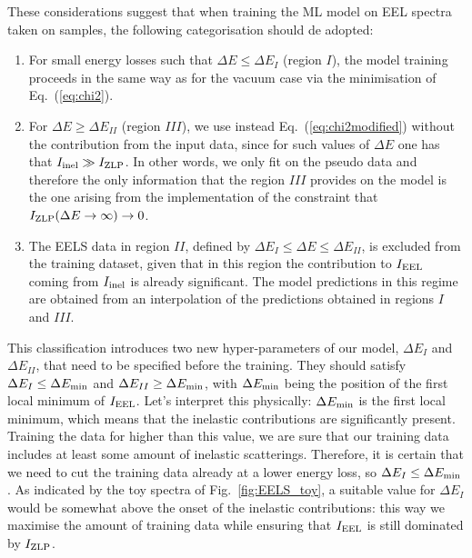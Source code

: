 These considerations suggest that when training the ML model on EEL spectra taken on samples,
the following categorisation should de adopted:

\begin{enumerate}

\item For small energy losses such that $\Delta E \le \Delta E_I$ (region $I$),
  the model training  proceeds in the same way as for the vacuum case
  via the minimisation of Eq.~(\ref{eq:chi2}).

\item  
  For $\Delta E \ge \Delta E_{II}$ (region $III$), we use instead Eq.~(\ref{eq:chi2modified})
  without the contribution from the input data, since for such values
  of $\Delta E$ one has that $I_{\rm inel}\gg I_{\rm ZLP}$.
  In other words, we only fit on the pseudo data and therefore
  the only information that the region $III$ provides
  on the model is the one arising from the implementation
  of the constraint that $I_{\rm ZLP}(\Delta E\to \infty)\to 0$.

\item The EELS data in region $II$, defined by $\Delta E_I \le \Delta E \le \Delta E_{II}$,
  is excluded from the training dataset, given that in this region the contribution to $I_{\rm EEL}$
  coming from $I_{\rm inel}$ is already significant.
  The model predictions in this regime are obtained from an interpolation
  of the predictions obtained in regions $I$ and $III$.

\end{enumerate}

This classification introduces two new hyper-parameters of our model, $\Delta E_I$ and
$\Delta E_{II}$, that need to be specified before the training.
%
They should satisfy $\Delta E_I \le \Delta E_{\rm min}$ and $\Delta E_{II} \ge \Delta E_{\rm min}$,
with $\Delta E_{\rm min}$ being the position of the first local minimum of $I_{\rm EEL}$.
%
Let's interpret this physically: $\Delta E_{\rm min}$ is the first local minimum, which means that 
the inelastic contributions are significantly present.
%
Training the data for higher than this value, we are sure that our training data includes
at least some amount of inelastic scatterings.
%
Therefore, it is certain that we need to cut the training data already at a lower energy loss,
so $\Delta E_I \le \Delta E_{\rm min}$.
%
As indicated by the toy spectra of Fig.~\ref{fig:EELS_toy}, a suitable value for $\Delta E_{I}$
would be somewhat above the onset of the inelastic contributions: this way we maximise
the amount of training data while ensuring that $I_{\rm EEL}$ is still dominated
by $I_{\rm ZLP}$.

